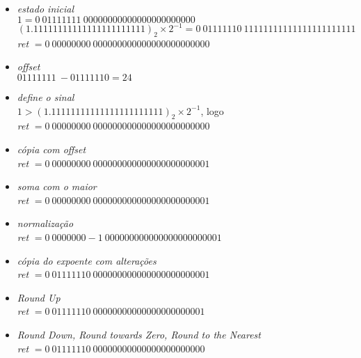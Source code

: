 \documentclass{article}
\begin{document}
\begin{itemize}
\begin{itemize}
    \item \textit{estado inicial} \\    
    $1 = {0}\ {01111111}\ {00000000000000000000000}$ \\
    ${(1.11111111111111111111111)}_{2} \times 2^{-1} = {0}\ {01111110}\ {11111111111111111111111}$ \\
    \textit{ret} $= {0}\ {00000000}\ {000000000000000000000000}$

    \item \textit{offset} \\
    ${01111111}\ - {01111110} = 24$
    
    \item \textit{define o sinal} \\
    $1 > {(1.11111111111111111111111)}_{2} \times 2^{-1}$, logo \\ 
    \textit{ret} $= {0}\ {00000000}\ {000000000000000000000000}$ \\
      
    \item \textit{cópia com offset} \\
    \textit{ret} $= {0}\ {00000000}\ {000000000000000000000001}$ \\
      
    \item \textit{soma com o maior} \\
    \textit{ret} $= {0}\ {00000000}\ {000000000000000000000001}$ \\

    \item \textit{normalização} \\
    \textit{ret} $= {0}\ {0000000-1}\ {000000000000000000000001}$ \\
    
    \item \textit{cópia do expoente com alterações} \\
    \textit{ret} $= {0}\ {01111110}\ {000000000000000000000001}$ \\
    
    \item \textit{Round Up} \\
    \textit{ret} $= {0}\ {01111110}\ {00000000000000000000001}$

    \item \textit{Round Down, Round towards Zero, Round to the Nearest} \\
    \textit{ret} $= {0}\ {01111110}\ {00000000000000000000000}$
    \end{itemize}


\end{itemize}
\end{document}
